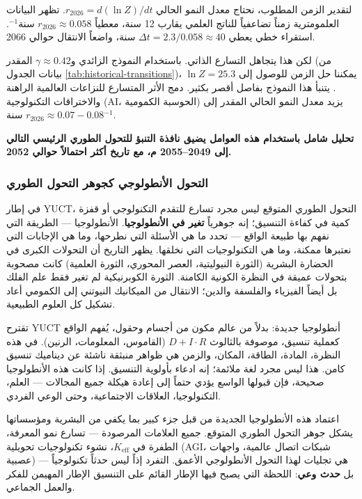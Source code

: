 \documentclass[11pt,a4paper]{article}
\begin{document}
	لتقدير الزمن المطلوب، نحتاج معدل النمو الحالي \(r_{2026} = d(\ln Z)/dt\). تظهر البيانات العلمومترية زمناً تضاعفياً للناتج العلمي يقارب 12 سنة، معطياً \(r_{2026} \approx 0.058\) سنة\(^{-1}\). استقراء خطي يعطي \(\Delta t = 2.3 / 0.058 \approx 40\) سنة، واضعاً الانتقال حوالي 2066.
	
	لكن هذا يتجاهل التسارع الذاتي. باستخدام النموذج الزائدي و\(\gamma \approx 0.42\) المقدر (من بيانات الجدول \ref{tab:historical-transitions})، يمكننا حل الزمن للوصول إلى \(\ln Z = 25.3\). يتنبأ هذا النموذج بفاصل أقصر بكثير. دمج الأثر المتسارع للنزاعات العالمية الراهنة والاختراقات التكنولوجية (AI، الحوسبة الكمومية) يزيد معدل النمو الحالي المقدر إلى \(r_{2026} \approx 0.07-0.08\) سنة\(^{-1}\).
	
	\textbf{تحليل شامل باستخدام هذه العوامل يضيق نافذة التنبؤ للتحول الطوري الرئيسي التالي إلى 2049–2055 م، مع تاريخ أكثر احتمالاً حوالي 2052.}
	
	\subsubsection{التحول الأنطولوجي كجوهر التحول الطوري}
	\label{subsubsec:ontological-shift}
	
	في إطار YUCT، التحول الطوري المتوقع ليس مجرد تسارع للتقدم التكنولوجي أو قفزة كمية في كفاءة التنسيق؛ إنه جوهرياً \textbf{تغير في الأنطولوجيا}. الأنطولوجيا — الطريقة التي نفهم بها طبيعة الواقع — تحدد ما هي الأسئلة التي نطرحها، وما هي الإجابات التي نعتبرها ممكنة، وما هي التكنولوجيات التي نخلقها. يظهر التاريخ أن التحولات الكبرى في الحضارة البشرية (الثورة النيوليتية، العصر المحوري، الثورة العلمية) كانت مصحوبة بتحولات عميقة في النظرة الكونية الكامنة. الثورة الكوبرنيكية لم تغير فقط علم الفلك بل أيضاً الفيزياء والفلسفة والدين؛ الانتقال من الميكانيك النيوتني إلى الكمومي أعاد تشكيل كل العلوم الطبيعية.
	
	تقترح YUCT أنطولوجيا جديدة: بدلاً من عالم مكون من أجسام وحقول، يُفهم الواقع كعملية تنسيق، موصوفة بالثالوث \(D + I \cdot R\) (القاموس، المعلومات، الرنين). في هذه النظرة، المادة، الطاقة، المكان، والزمن هي ظواهر منبثقة ناشئة عن ديناميك تنسيق كامن. هذا ليس مجرد لغة ملائمة؛ إنه ادعاء بأولوية التنسيق. إذا كانت هذه الأنطولوجيا صحيحة، فإن قبولها الواسع يؤدي حتماً إلى إعادة هيكلة جميع المجالات — العلم، التكنولوجيا، العلاقات الاجتماعية، وحتى الوعي الفردي.
	
	اعتماد هذه الأنطولوجيا الجديدة من قبل جزء كبير بما يكفي من البشرية ومؤسساتها يشكل جوهر التحول الطوري المتوقع. جميع العلامات المرصودة — تسارع نمو المعرفة، الطفرة في \(K_{\text{eff}}\)، نشوء تكنولوجيات تحويلية (AGI، شبكات اتصال عالمية، واجهات عصبية) — هي تجليات لهذا التحول الأنطولوجي الأعمق. التفرد إذاً ليس حدثاً تكنولوجياً بل \textbf{حدث وعي}: اللحظة التي يصبح فيها الإطار القائم على التنسيق الإطار المهيمن للفكر والعمل الجماعي.
	
\end{document}
